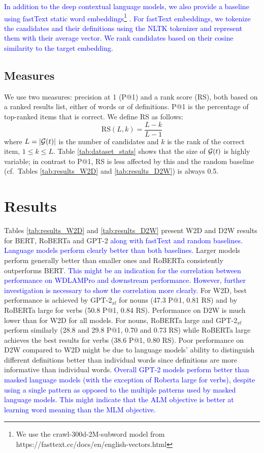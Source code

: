 \documentclass[11pt,a4paper]{article}
\begin{document}
\textcolor{blue}{In addition to the deep contextual language
  models, we also provide a baseline using fastText static
  word embeddings\footnote{We use the crawl-300d-2M-subword
    model from
    https://fasttext.cc/docs/en/english-vectors.html}
  \cite{mikolov18fastText}. For fastText embeddings, we
  tokenize the candidates and their definitions using the
  NLTK tokenizer and represent them with their average
  vector. We rank candidates based on their cosine
  similarity to the target embedding. }
%

\subsection{Measures}
We use two measures: precision at 1 (P@1) and a rank score
(RS), both based on a ranked results list, either of words
or of definitions. P@1 is the percentage of top-ranked items
that is correct.
We define RS as follows:  
\begin{equation*}
    \text{RS}(L,k) = \frac{L-k}{L-1}
\end{equation*}
where $L=|{\cal G}(t)|$ is the number of candidates  and
$k$ is the rank of the correct item, $1 \leq k \leq L$.
Table \ref{tab:dataset_stats} shows that the size of ${\cal G}(t)$
is highly variable;
in contrast to P@1, RS is less affected by
this and the random baseline (cf.\ Tables
\ref{tab:results_W2D}
and \ref{tab:results_D2W}) is always 0.5.  

\section{Results}

Tables \ref{tab:results_W2D} and 
\ref{tab:results_D2W} present
W2D and D2W
results for
BERT, RoBERTa and GPT-2 \textcolor{blue}{along with fastText and random baselines. Language models perform clearly better than both baselines.}
Larger models perform generally better than smaller
ones and RoBERTa consistently outperforms BERT.
\textcolor{blue}{This might be an indication for the correlation between performance on WDLAMPro and downstream performance. However, further investigation is necessary to show the correlation more clearly.}
For W2D, best performance is achieved by GPT-2$_{xl}$  for nouns (47.3 P@1, 0.81 RS) and by RoBERTa large for  verbs (50.8 P@1, 0.84 RS). 
Performance on D2W is much lower than for W2D for all models. 
For nouns, RoBERTa large and GPT-2$_{xl}$ perform similarly (28.8 and 29.8 P@1, 0.70 and 0.73 RS) while RoBERTa large achieves the best results for verbs (38.6 P@1, 0.80 RS).
Poor performance on D2W compared to W2D might be due to language models' ability to distinguish different definitions better than individual words since definitions are more informative  than individual words. 
\textcolor{blue}{Overall GPT-2 models perform better than
  masked language models (with the exception of Roberta
  large for verbs), despite using a single pattern as
  opposed to the multiple patterns used by masked language
  models. This might indicate that the ALM objective is
  better at learning word meaning than the MLM objective. }
\end{document}
